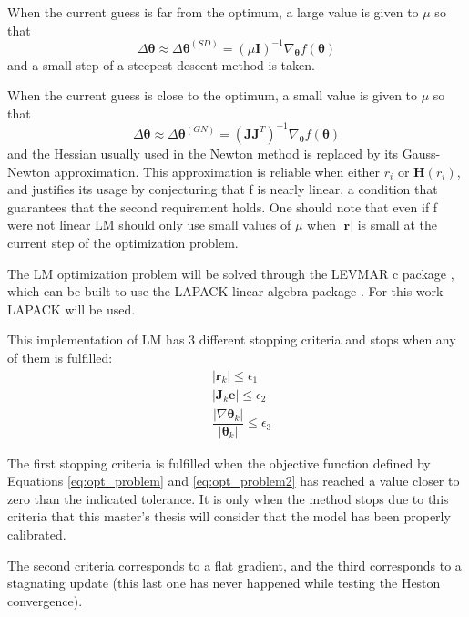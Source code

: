 \documentclass[12,twoside]{mammeTFM}
\theoremstyle{definition}
\theoremstyle{remark}
\begin{document}
When the current guess is far from the optimum, a large value is given to $\mu$ so that
\begin{equation}
\Delta \boldsymbol{\theta} \approx \Delta \boldsymbol{\theta}^{(SD)} = (\mu \boldsymbol{I})^{-1} \nabla_{\boldsymbol{\theta}} f(\boldsymbol{\theta})
\end{equation}
and a small step of a steepest-descent method is taken.

When the current guess is close to the optimum, a small value is given to $\mu$ so that
\begin{equation}
\Delta \boldsymbol{\theta} \approx \Delta \boldsymbol{\theta}^{(GN)} = (\boldsymbol{J}\boldsymbol{J}^{T})^{-1} \nabla_{\boldsymbol{\theta}} f(\boldsymbol{\theta})
\end{equation}
and the Hessian usually used in the Newton method is replaced by its Gauss-Newton approximation. This approximation is reliable when either $r_i$ or $\boldsymbol{H}(r_i)$, and \cite{cui17} justifies its usage by conjecturing that f is nearly linear, a condition that guarantees that the second requirement holds. One should note that even if f were not linear LM should only use small values of $\mu$ when $|\boldsymbol{r}|$ is small at the current step of the optimization problem.

The LM optimization problem will be solved through the LEVMAR c package \cite{levmar}, which can be built to use the LAPACK linear algebra package \cite{lapack}. For this work LAPACK will be used.

This implementation of LM has 3 different stopping criteria and stops when any of them is fulfilled:
\begin{align}
&|\boldsymbol{r}_k| \leq \epsilon_1 \\
&|\boldsymbol{J}_k\boldsymbol{e}| \leq \epsilon_2 \\
&\dfrac{|\nabla \boldsymbol{\theta}_k|}{|\boldsymbol{\theta}_k|} \leq \epsilon_3
\end{align}

The first stopping criteria is fulfilled when the objective function defined by Equations \ref{eq:opt_problem} and \ref{eq:opt_problem2} has reached a value closer to zero than the indicated tolerance. It is only when the method stops due to this criteria that this master's thesis will consider that the model has been properly calibrated.

The second criteria corresponds to a flat gradient, and the third corresponds to a stagnating update (this last one has never happened while testing the Heston convergence).
\end{document}
